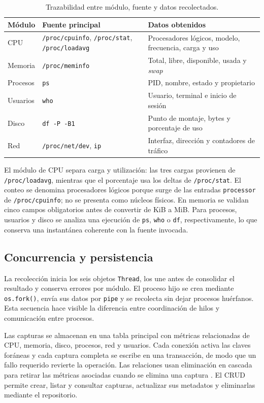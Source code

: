 \documentclass[conference]{IEEEtran}
\begin{document}
\begin{table}[t]
\caption{Trazabilidad entre m\'odulo, fuente y datos recolectados.}
\label{tab:fuentes}
\centering
\footnotesize
\begin{tabular}{@{}p{}p{}p{}@{}}
\toprule
M\'odulo & Fuente principal & Datos obtenidos \\
\midrule
CPU & \texttt{/proc/cpuinfo}, \texttt{/proc/stat}, \texttt{/proc/loadavg} & Procesadores l\'ogicos, modelo, frecuencia, carga y uso \\
Memoria & \texttt{/proc/meminfo} & Total, libre, disponible, usada y \textit{swap} \\
Procesos & \texttt{ps} & PID, nombre, estado y propietario \\
Usuarios & \texttt{who} & Usuario, terminal e inicio de sesi\'on \\
Disco & \texttt{df -P -B1} & Punto de montaje, bytes y porcentaje de uso \\
Red & \texttt{/proc/net/dev}, \texttt{ip} & Interfaz, direcci\'on y contadores de tr\'afico \\
\bottomrule
\end{tabular}
\end{table}

El m\'odulo de CPU separa carga y utilizaci\'on: las tres cargas provienen de \texttt{/proc/loadavg}, mientras que el porcentaje usa los deltas de \texttt{/proc/stat}. El conteo se denomina procesadores l\'ogicos porque surge de las entradas \texttt{processor} de \texttt{/proc/cpuinfo}; no se presenta como n\'ucleos f\'isicos. En memoria se validan cinco campos obligatorios antes de convertir de KiB a MiB. Para procesos, usuarios y disco se analiza una ejecuci\'on de \texttt{ps}, \texttt{who} o \texttt{df}, respectivamente, lo que conserva una instant\'anea coherente con la fuente invocada.

\subsection{Concurrencia y persistencia}
La recolecci\'on inicia los seis objetos \texttt{Thread}, los une antes de consolidar el resultado y conserva errores por m\'odulo. El proceso hijo se crea mediante \texttt{os.fork()}, env\'ia sus datos por \texttt{pipe} y se recolecta sin dejar procesos hu\'erfanos. Esta secuencia hace visible la diferencia entre coordinaci\'on de hilos y comunicaci\'on entre procesos.

Las capturas se almacenan en una tabla principal con m\'etricas relacionadas de CPU, memoria, disco, procesos, red y usuarios. Cada conexi\'on activa las claves for\'aneas y cada captura completa se escribe en una transacci\'on, de modo que un fallo requerido revierte la operaci\'on. Las relaciones usan eliminaci\'on en cascada para retirar las m\'etricas asociadas cuando se elimina una captura \cite{sqlitefk,sqlitetransactions}. El CRUD permite crear, listar y consultar capturas, actualizar sus metadatos y eliminarlas mediante el repositorio.
\end{document}
